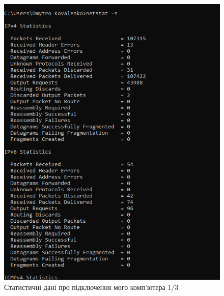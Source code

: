 \documentclass{article}
\begin{document}
\begin{normalsize}
\begin{figure}[H]
	\centering
	\includegraphics[width=\textwidth]{51}
	\caption{Статистичні дані про підключення
		мого комп'ютера 1/3}
\end{figure}


\end{normalsize}
\end{document}
